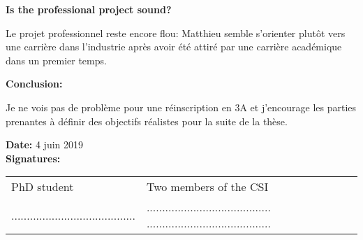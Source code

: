 \documentclass[12pt]{article}
\newcommand{\commentaire}[1]{}
\begin{document}
\medskip
\noindent\textbf{Is the professional project sound?}
\commentaire{%
  E.g.: What is the professional project of the PhD student for after
  the PhD? Is she/he aware of the various options and associated
  expectations (postdoc abroad or in France, industrial R\&D,
  application periods, teaching requirements, etc.)? Have contacts
  been established? Do you have comments about the PhD student’s
  plans for her/his training courses/schools?\\}

Le projet professionnel reste encore flou: Matthieu semble s'orienter plutôt
vers une carrière dans l'industrie après avoir été attiré par une carrière
académique dans un premier temps.

\medskip
\noindent\textbf{Conclusion:}

Je ne vois pas de problème pour une réinscription en 3A et j'encourage les
parties prenantes à définir des objectifs réalistes pour la suite de la thèse.

\bigskip

\noindent\textbf{Date:}
4 juin 2019
\\

\noindent\textbf{Signatures:}

\begin{tabular}{@{}p{5cm}p{12cm}}
  PhD student & Two members of the CSI\\[2ex]
  ........................................
  &
  ........................................
  ........................................
\end{tabular}
\end{document}
